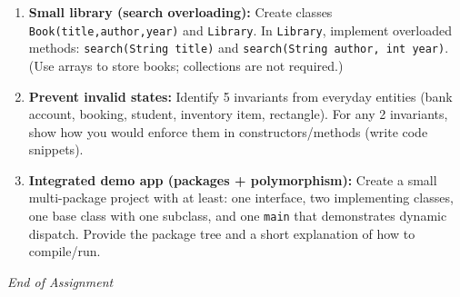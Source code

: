 \documentclass[11pt,a4paper]{article}
\begin{document}
\begin{enumerate}[label=H\arabic*., leftmargin=*]
  \item \textbf{Small library (search overloading):} Create classes \texttt{Book(title,author,year)} and \texttt{Library}.
    In \texttt{Library}, implement overloaded methods:
    \texttt{search(String title)} and \texttt{search(String author, int year)}.
    (Use arrays to store books; collections are not required.)

  \item \textbf{Prevent invalid states:} Identify 5 invariants from everyday entities (bank account, booking, student, inventory item, rectangle).
    For any 2 invariants, show how you would enforce them in constructors/methods (write code snippets).

  \item \textbf{Integrated demo app (packages + polymorphism):} Create a small multi-package project with at least:
    one interface, two implementing classes, one base class with one subclass, and one \texttt{main} that demonstrates dynamic dispatch.
    Provide the package tree and a short explanation of how to compile/run.
\end{enumerate}

\vfill
\noindent\textit{End of Assignment}
\end{document}
